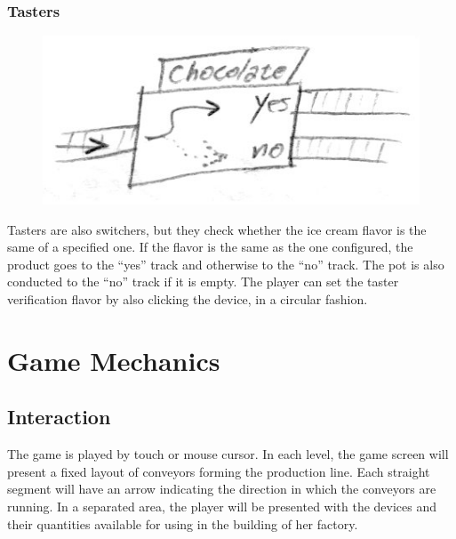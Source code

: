 \documentclass[a4paper]{scrartcl}
\begin{document}
        \subsubsection{Tasters}
            \begin{minipage}[t][5em][t]{\textwidth}
                \begin{figure}
                    \vspace{-20pt}
                    \includegraphics[scale=1]{devices/taster}
                    \vspace{-20pt}
                \end{figure}

                Tasters are also switchers, but they check whether the ice cream
                flavor is the same of a specified one. If the flavor is the same
                as the one configured, the product goes to the ``yes'' track and
                otherwise to the ``no'' track. The pot is also conducted to the
                ``no'' track if it is empty. The player can set the taster
                verification flavor by also clicking the device, in a circular
                fashion.
            \end{minipage}

\section{Game Mechanics}

    \subsection{Interaction}
        The game is played by touch or mouse cursor. In each level, the game
        screen will present a fixed layout of conveyors forming the production
        line. Each straight segment will have an arrow indicating the direction
        in which the conveyors are running. In a separated area, the player will
        be presented with the devices and their quantities available for using
        in the building of her factory.
\end{document}
